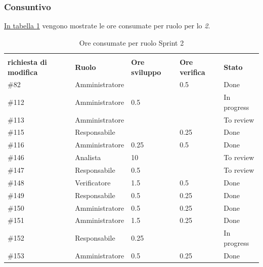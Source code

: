 \subsubsection{Consuntivo}

\hyperref[tab:sprint2_ore_consumate]{In tabella \ref{tab:sprint2_ore_consumate}} vengono mostrate le ore consumate per ruolo per lo \textit{ 2}.

\begin{table}[H]
    \centering
    \begin{tabular}{| l | l | l | l | l |}
        \hline
                \makecell{\textbf{Identificativo} \\ \textbf{richiesta di modifica}} &
                \textbf{Ruolo} & 
                \textbf{Ore sviluppo} &
                \textbf{Ore verifica} & 
                \textbf{Stato}\\ 
    \hline
        \#82 & Amministratore &  & 0.5 & Done \\
    \hline
        \#112 & Amministratore & 0.5 &  & In progress \\
    \hline
        \#113 & Amministratore &  &  & To review \\
    \hline
        \#115 & Responsabile &  & 0.25 & Done \\
    \hline
        \#116 & Amministratore & 0.25 & 0.5 & Done \\
    \hline
        \#146 & Analista & 10 &  & To review \\
    \hline
        \#147 & Responsabile & 0.5 & & To review \\
    \hline
        \#148 & Verificatore & 1.5 & 0.5 & Done \\
    \hline
        \#149 & Responsabile & 0.5 & 0.25 & Done \\
    \hline
        \#150 & Amministratore & 0.5 & 0.25 & Done \\
     \hline
        \#151 & Amministratore & 1.5 & 0.25 & Done \\
    \hline
        \#152 & Responsabile & 0.25 &  & In progress \\
    \hline
        \#153 & Amministratore& 0.5 & 0.25 & Done \\
    \hline
    \end{tabular}
    \caption{Ore consumate per ruolo Sprint 2}
    \label{tab:sprint2_ore_consumate} 
\end{table}